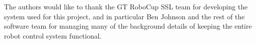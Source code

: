 \documentclass[a4paper, 10pt, conference]{ieeeconf}      %
\begin{document}
The authors would like to thank the GT RoboCup SSL team for developing the system used for this project, and in particular Ben Johnson and the rest of the software team for managing many of the background details of keeping the entire robot control system functional. 




% 
% 
% 
% 
\end{document}
